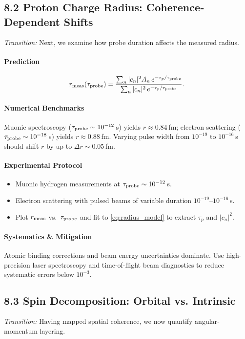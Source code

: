 \subsection{8.2 Proton Charge Radius: Coherence‐Dependent Shifts}  
\emph{Transition:} Next, we examine how probe duration affects the measured radius.

\paragraph{Prediction}  
\begin{equation}\label{eq:radius_model}
r_{\rm meas}(\tau_{\rm probe})
=\frac{\sum_n |c_n|^2 A_n \, e^{-\tau_p/\tau_{\rm probe}}}
       {\sum_n |c_n|^2 \, e^{-\tau_p/\tau_{\rm probe}}}.
\end{equation}

\paragraph{Numerical Benchmarks}  
Muonic spectroscopy (\(\tau_{\rm probe}\sim10^{-12}\) s) yields \(r\approx0.84\) fm; electron scattering (\(\tau_{\rm probe}\sim10^{-18}\) s) yields \(r\approx0.88\) fm.  Varying pulse width from \(10^{-19}\) to \(10^{-16}\) s should shift \(r\) by up to \(\Delta r\sim0.05\) fm.

\paragraph{Experimental Protocol}  
\begin{itemize}
  \item Muonic hydrogen measurements at \(\tau_{\rm probe}\sim10^{-12}\) s.  
  \item Electron scattering with pulsed beams of variable duration \(10^{-19}\)–\(10^{-16}\) s.  
  \item Plot \(r_{\rm meas}\) vs.\ \(\tau_{\rm probe}\) and fit to \eqref{eq:radius_model} to extract \(\tau_p\) and \(|c_n|^2\).
\end{itemize}

\paragraph{Systematics \& Mitigation}  
Atomic binding corrections and beam energy uncertainties dominate.  Use high-precision laser spectroscopy and time-of-flight beam diagnostics to reduce systematic errors below \(10^{-3}\).

\subsection{8.3 Spin Decomposition: Orbital vs. Intrinsic}  
\emph{Transition:} Having mapped spatial coherence, we now quantify angular‐momentum layering.

